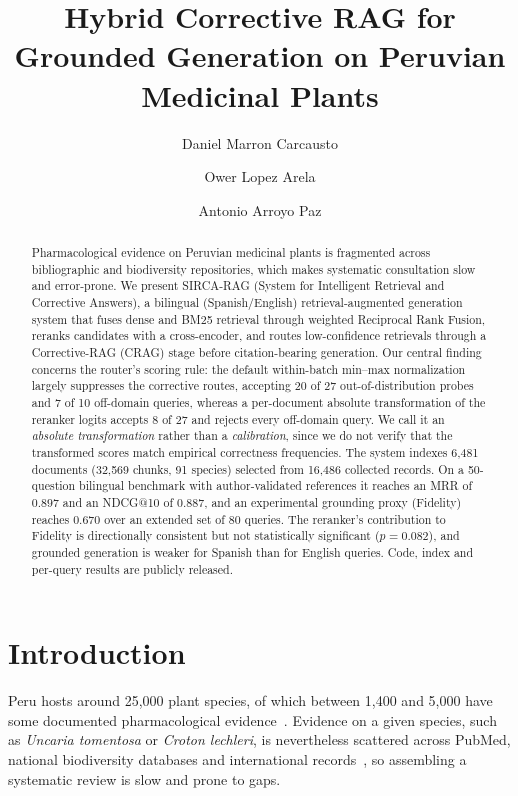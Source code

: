 \documentclass[runningheads]{llncs}
\title{Hybrid Corrective RAG for Grounded Generation
on Peruvian Medicinal Plants}
\author{Daniel Marron Carcausto \and
Ower Lopez Arela \and
Antonio Arroyo Paz}
\institute{Universidad Nacional de San Agust\'{i}n de Arequipa, Arequipa, Peru\\
\email{marrondaniel20@gmail.com, olopeza@unsa.edu.pe, aarroyop@unsa.edu.pe}}
\newcommand{\sirca}{\textsc{SIRCA-RAG}}
\begin{document}
\sloppy
\maketitle

\begin{abstract}
Pharmacological evidence on Peruvian medicinal plants is fragmented across bibliographic and biodiversity repositories, which makes systematic consultation slow and error-prone. We present \sirca{} (System for Intelligent Retrieval and Corrective Answers), a bilingual (Spanish/English) retrieval-augmented generation system that fuses dense and BM25 retrieval through weighted Reciprocal Rank Fusion, reranks candidates with a cross-encoder, and routes low-confidence retrievals through a Corrective-RAG (CRAG) stage before citation-bearing generation. Our central finding concerns the router's scoring rule: the default within-batch min--max normalization largely suppresses the corrective routes, accepting 20 of 27 out-of-distribution probes and 7 of 10 off-domain queries, whereas a per-document absolute transformation of the reranker logits accepts 8 of 27 and rejects every off-domain query. We call it an \emph{absolute transformation} rather than a \emph{calibration}, since we do not verify that the transformed scores match empirical correctness frequencies. The system indexes 6,481 documents (32,569 chunks, 91 species) selected from 16,486 collected records. On a 50-question bilingual benchmark with author-validated references it reaches an MRR of $0.897$ and an NDCG@10 of $0.887$, and an experimental grounding proxy (Fidelity) reaches $0.670$ over an extended set of 80 queries. The reranker's contribution to Fidelity is directionally consistent but not statistically significant ($p{=}0.082$), and grounded generation is weaker for Spanish than for English queries. Code, index and per-query results are publicly released.

\end{abstract}

\section{Introduction}
\label{sec:intro}

Peru hosts around 25,000 plant species, of which between 1,400 and 5,000 have some documented pharmacological evidence~\cite{bussmann2011toxicity,bussmann2006traditional}. Evidence on a given species, such as \textit{Uncaria tomentosa} or \textit{Croton lechleri}, is nevertheless scattered across PubMed, national biodiversity databases and international records~\cite{gonzales2012ethnobiology,lock2016bioactive}, so assembling a systematic review is slow and prone to gaps.
\end{document}
